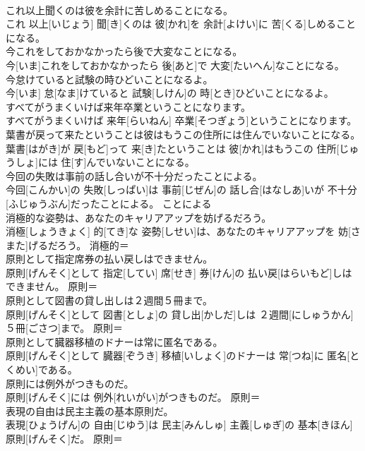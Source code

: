 \documentclass[8pt]{extreport}
\begin{document}
\begin{CJK}{UTF8}{min}
\\	これ以上聞くのは彼を余計に苦しめることになる。	
\\	これ 以上[いじょう] 聞[き]くのは 彼[かれ]を 余計[よけい]に 苦[くる]しめることになる。	
\\	今これをしておかなかったら後で大変なことになる。	
\\	今[いま]これをしておかなかったら 後[あと]で 大変[たいへん]なことになる。	
\\	今怠けていると試験の時ひどいことになるよ。	
\\	今[いま] 怠[なま]けていると 試験[しけん]の 時[とき]ひどいことになるよ。	
\\	すべてがうまくいけば来年卒業ということになります。	
\\	すべてがうまくいけば 来年[らいねん] 卒業[そつぎょう]ということになります。	
\\	葉書が戻って来たということは彼はもうこの住所には住んでいないことになる。	
\\	葉書[はがき]が 戻[もど]って 来[き]たということは 彼[かれ]はもうこの 住所[じゅうしょ]には 住[す]んでいないことになる。	
\\	今回の失敗は事前の話し合いが不十分だったことによる。	
\\	今回[こんかい]の 失敗[しっぱい]は 事前[じぜん]の 話し合[はなしあ]いが 不十分[ふじゅうぶん]だったことによる。	ことによる 
\\	消極的な姿勢は、あなたのキャリアアップを妨げるだろう。	
\\	消極[しょうきょく] 的[てき]な 姿勢[しせい]は、あなたのキャリアアップを 妨[さまた]げるだろう。	消極的＝ 
\\	原則として指定席券の払い戻しはできません。	
\\	原則[げんそく]として 指定[してい] 席[せき] 券[けん]の 払い戻[はらいもど]しはできません。	原則＝ 
\\	原則として図書の貸し出しは２週間５冊まで。	
\\	原則[げんそく]として 図書[としょ]の 貸し出[かしだ]しは ２週間[にしゅうかん] ５冊[ごさつ]まで。	原則＝ 
\\	原則として臓器移植のドナーは常に匿名である。	
\\	原則[げんそく]として 臓器[ぞうき] 移植[いしょく]のドナーは 常[つね]に 匿名[とくめい]である。	
\\	原則には例外がつきものだ。	
\\	原則[げんそく]には 例外[れいがい]がつきものだ。	原則＝ 
\\	表現の自由は民主主義の基本原則だ。	
\\	表現[ひょうげん]の 自由[じゆう]は 民主[みんしゅ] 主義[しゅぎ]の 基本[きほん] 原則[げんそく]だ。	原則＝ 

\end{CJK}
\end{document}
